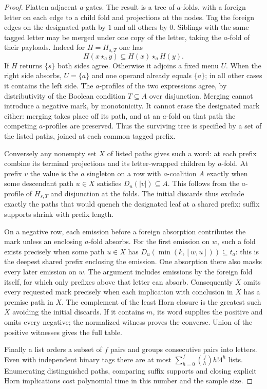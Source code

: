 \begin{proof}
Flatten adjacent $a$-gates. The result is a tree of $a$-folds, with
a foreign letter on each edge to a child fold and projections at
the nodes. Tag the foreign edges on the designated path by $1$ and
all others by $0$. Siblings with the same tagged letter may be
merged under one copy of the letter, taking the $a$-fold of their
payloads. Indeed for $H=H_{s,T}$ one has
\[
 H(x\star_a y)\subseteq H(x)\star_a H(y).
\]
If $H$ returns $\{s\}$ both sides agree. Otherwise it adjoins a fixed
menu $U$. When the right side absorbs, $U=\{a\}$ and one operand
already equals $\{a\}$; in all other cases it contains the left
side. The $a$-profiles of the two expressions agree, by distributivity
of the Boolean condition $T\subseteq A$ over disjunction. Merging
cannot introduce a negative mark, by monotonicity. It cannot erase
the designated mark either: merging takes place off its path, and
at an $a$-fold on that path the competing $a$-profiles are preserved.
Thus the surviving tree is specified by a set of the listed paths,
joined at each common tagged prefix.

Conversely any nonempty set $X$ of listed paths gives such a word:
at each prefix combine its terminal projections and its letter-wrapped
children by $a$-fold. At prefix $v$ the value is the $a$ singleton
on a row with $a$-coalition $A$ exactly when some descendant path
$u\in X$ satisfies $D_u(|v|)\subseteq A$. This follows from the
$a$-profile of $H_{s,T}$ and disjunction at the folds. The initial
discards thus exclude exactly the paths that would quench the
designated leaf at a shared prefix: suffix supports shrink with
prefix length.

On a negative row, each emission before a foreign absorption
contributes the mark unless an enclosing $a$-fold absorbs.
For the first emission on $w$, such a fold exists precisely when
some path $u\in X$ has $D_u(\min(k,[w,u]))\subseteq t_a$:
this is the deepest shared prefix enclosing the emission.
One absorption there also masks every later emission on $w$.
The argument includes emissions by the foreign fold itself, for
which only prefixes above that letter can absorb. Consequently $X$
omits every requested mark precisely when each implication with
conclusion in $X$ has a premise path in $X$. The complement of
the least Horn closure is the greatest such $X$ avoiding the
initial discards. If it contains $m$, its word supplies the positive
and omits every negative; the normalized witness proves the converse.
Union of the positive witnesses gives the full table.

Finally a list orders a subset of $f$ pairs and groups consecutive
pairs into letters. Even with independent binary tags there are at
most $\sum_{h=0}^f \binom fh h!4^h$ lists. Enumerating distinguished
paths, comparing suffix supports and closing explicit Horn implications
cost polynomial time in this number and the sample size.
\end{proof}


